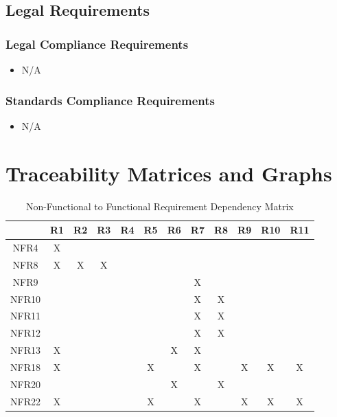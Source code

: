 \documentclass[12pt]{article}
\newcounter{nfrnum} %
\begin{document}
\subsection{Legal Requirements}
  \subsubsection{Legal Compliance Requirements}
    \noindent \begin{itemize}
		\item N/A
    \end{itemize}
  \subsubsection{Standards Compliance Requirements}
    \noindent \begin{itemize}
      \item N/A
    \end{itemize}
	\section{Traceability Matrices and Graphs}
	
	\begin{table}[h!]
		\centering
		\begin{tabular}{|c|c|c|c|c|c|c|c|c|c|c|c|}
			\hline
			& R1 & R2 & R3 & R4 & R5 & R6 & R7 & R8 & R9 & R10 & R11 \\ \hline
			NFR4 &X & & & & & & & & & & \\ \hline
			NFR8 &X &X &X & & & & & & & & \\ \hline
			NFR9 & & & & & & &X & & & & \\ \hline %
			NFR10 & & & & & & &X &X & & & \\ \hline %
			NFR11 & & & & & & &X &X & & &\\ \hline %
			NFR12 & & & & & & &X &X & & & \\ \hline %
			NFR13 &X & & & & &X &X & & & & \\ \hline %
			NFR18 &X & & & &X & &X & &X &X &X \\ \hline %
			NFR20 & & & & & &X & &X & & & \\ \hline %
			NFR22 &X & & & &X & &X & &X &X &X \\ \hline %
		\end{tabular}
		\caption{Non-Functional to Functional Requirement Dependency Matrix}
		\label{Table:R_trace}
	\end{table}
\end{document}
